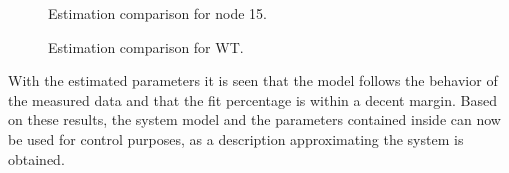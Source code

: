 \begin{figure}[H]
   \centering
    
    \caption{Estimation comparison for node 15.}
\end{figure}


\begin{figure}[H]
   \centering
    
    \caption{Estimation comparison for WT.}
\end{figure}


With the estimated parameters it is seen that the model follows the behavior of the measured data and that the fit percentage is within a decent margin. 
Based on these results, the system model and the parameters contained inside can now be used for control purposes, as a description approximating the 
system is obtained.   


